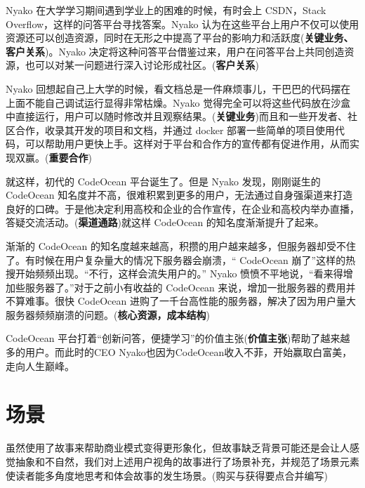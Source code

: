 \documentclass[a4paper]{ctexart}
\begin{document}
Nyako 在大学学习期间遇到学业上的困难的时候，有时会上 CSDN，Stack Overflow，这样的问答平台寻找答案。Nyako 认为在这些平台上用户不仅可以使用资源还可以创造资源，同时在无形之中提高了平台的影响力和活跃度(\textbf{关键业务、客户关系})。Nyako 决定将这种问答平台借鉴过来，用户在问答平台上共同创造资源，也可以对某一问题进行深入讨论形成社区。(\textbf{客户关系})

Nyako 回想起自己上大学的时候，看文档总是一件麻烦事儿，干巴巴的代码摆在上面不能自己调试运行显得非常枯燥。Nyako 觉得完全可以将这些代码放在沙盒中直接运行，用户可以随时修改并且观察结果。(\textbf{关键业务})而且和一些开发者、社区合作，收录其开发的项目和文档，并通过 docker 部署一些简单的项目使用代码，可以帮助用户更快上手。这样对于平台和合作方的宣传都有促进作用，从而实现双赢。(\textbf{重要合作})

就这样，初代的 CodeOcean 平台诞生了。但是 Nyako 发现，刚刚诞生的CodeOcean 知名度并不高，很难积累到更多的用户，无法通过自身强渠道来打造良好的口碑。于是他决定利用高校和企业的合作宣传，在企业和高校内举办直播，答疑交流活动。(\textbf{渠道通路})就这样 CodeOcean 的知名度渐渐提升了起来。

渐渐的 CodeOcean 的知名度越来越高，积攒的用户越来越多，但服务器却受不住了。有时候在用户复杂量大的情况下服务器会崩溃，“ CodeOcean 崩了”这样的热搜开始频频出现。“不行，这样会流失用户的。” Nyako 愤愤不平地说，“看来得增加些服务器了。”对于之前小有收益的 CodeOcean 来说，增加一批服务器的费用并不算难事。很快 CodeOcean 进购了一千台高性能的服务器，解决了因为用户量大服务器频频崩溃的问题。(\textbf{核心资源，成本结构})

CodeOcean 平台打着“创新问答，便捷学习”的价值主张(\textbf{价值主张})帮助了越来越多的用户。而此时的CEO Nyako也因为CodeOcean收入不菲，开始赢取白富美，走向人生巅峰。



\section{场景}
虽然使用了故事来帮助商业模式变得更形象化，但故事缺乏背景可能还是会让人感觉抽象和不自然，我们对上述用户视角的故事进行了场景补充，并规范了场景元素使读者能多角度地思考和体会故事的发生场景。(购买与获得要点合并编写)
\end{document}
